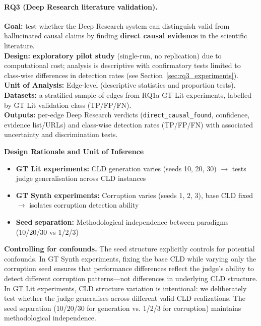 \paragraph{RQ3 (Deep Research literature validation).}
\begin{center}
\end{center}
\vspace{-0.8em}
\textbf{Goal:} test whether the Deep Research system can distinguish valid from hallucinated causal claims by finding \textbf{direct causal evidence} in the scientific literature.\\
\textbf{Design:} \textbf{exploratory pilot study} (single-run, no replication) due to computational cost; analysis is descriptive with confirmatory tests limited to class-wise differences in detection rates (see Section~\ref{sec:rq3_experiments}).\\
\textbf{Unit of Analysis:} Edge-level (descriptive statistics and proportion tests).\\
\textbf{Datasets:} a stratified sample of edges from RQ1a GT Lit experiments, labelled by GT Lit validation class (TP/FP/FN).\\
\textbf{Outputs:} per-edge Deep Research verdicts (\texttt{direct\_causal\_found}, confidence, evidence list/URLs) and class-wise detection rates (TP/FP/FN) with associated uncertainty and discrimination tests.

\noindent\textbf{Design Rationale and Unit of Inference}
\label{sec:block_design}
\begin{itemize}[noitemsep]
    \item \textbf{GT Lit experiments:} CLD generation varies (seeds 10, 20, 30) $\rightarrow$ tests judge generalisation across CLD instances
    \item \textbf{GT Synth experiments:} Corruption varies (seeds 1, 2, 3), base CLD fixed $\rightarrow$ isolates corruption detection ability
    \item \textbf{Seed separation:} Methodological independence between paradigms (10/20/30 vs 1/2/3)
\end{itemize}

\textbf{Controlling for confounds.} The seed structure explicitly controls for potential confounds. In GT Synth experiments, fixing the base CLD while varying only the corruption seed ensures that performance differences reflect the judge's ability to detect different corruption patterns---not differences in underlying CLD structure. In GT Lit experiments, CLD structure variation is intentional: we deliberately test whether the judge generalises across different valid CLD realizations. The seed separation (10/20/30 for generation vs. 1/2/3 for corruption) maintains methodological independence.

